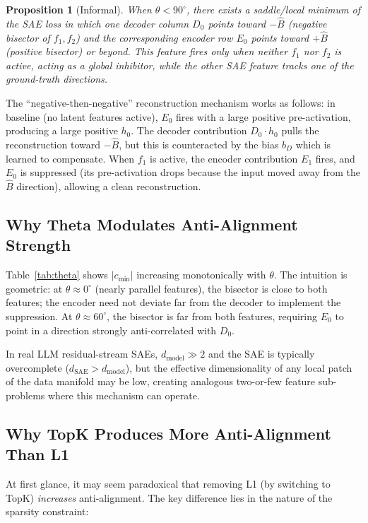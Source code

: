 \documentclass[11pt,a4paper]{article}
\newtheorem{proposition}{Proposition}
\begin{document}
\begin{proposition}[Informal]
When $\theta < 90^\circ$, there exists a saddle/local minimum of the SAE loss in which
one decoder column $D_0$ points toward $-\hat{B}$ (negative bisector of $f_1, f_2$) and
the corresponding encoder row $E_0$ points toward $+\hat{B}$ (positive bisector) or
beyond.  This feature fires \emph{only} when neither $f_1$ nor $f_2$ is active, acting as
a global inhibitor, while the other SAE feature tracks one of the ground-truth directions.
\end{proposition}

The ``negative-then-negative'' reconstruction mechanism works as follows: in baseline
(no latent features active), $E_0$ fires with a large positive pre-activation, producing
a large positive $h_0$.  The decoder contribution $D_0 \cdot h_0$ pulls the reconstruction
toward $-\hat{B}$, but this is counteracted by the bias $b_D$ which is learned to
compensate.  When $f_1$ is active, the encoder contribution $E_1$ fires, and $E_0$ is
suppressed (its pre-activation drops because the input moved away from the $\hat{B}$
direction), allowing a clean reconstruction.

\subsection{Why Theta Modulates Anti-Alignment Strength}

Table~\ref{tab:theta} shows $|c_{\min}|$ increasing monotonically with $\theta$.  The
intuition is geometric: at $\theta \approx 0^\circ$ (nearly parallel features), the
bisector is close to both features; the encoder need not deviate far from the decoder to
implement the suppression.  At $\theta \approx 60^\circ$, the bisector is far from both
features, requiring $E_0$ to point in a direction strongly anti-correlated with $D_0$.

In real LLM residual-stream SAEs, $d_{\mathrm{model}} \gg 2$ and the SAE is typically
overcomplete ($d_{\mathrm{SAE}} > d_{\mathrm{model}}$), but the effective dimensionality
of any local patch of the data manifold may be low, creating analogous two-or-few feature
sub-problems where this mechanism can operate.

\subsection{Why TopK Produces More Anti-Alignment Than L1}

At first glance, it may seem paradoxical that removing L1 (by switching to TopK)
\emph{increases} anti-alignment.  The key difference lies in the nature of the sparsity
constraint:
\end{document}
